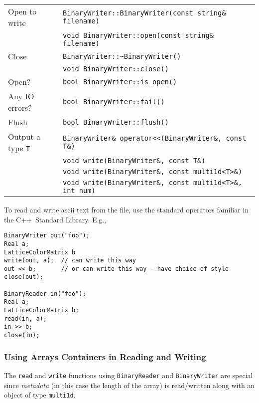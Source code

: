 \documentclass[12pt,letterpaper]{article}
\newcommand{\cpp}{C++}
\begin{document}
\begin{flushleft}
  \begin{tabular}{|l|l|}
  \hline
  Open to write  & \verb|BinaryWriter::BinaryWriter(const string& filename)|\\
                 & \verb|void BinaryWriter::open(const string& filename)|\\
  \hline
  Close          & \verb|BinaryWriter::~BinaryWriter()|\\
                 & \verb|void BinaryWriter::close()|\\
  \hline
  Open?          & \verb|bool BinaryWriter::is_open()| \\
  \hline
  Any IO errors? & \verb|bool BinaryWriter::fail()| \\
  \hline
  Flush          & \verb|bool BinaryWriter::flush()| \\
  \hline
  Output a type \verb|T| & \verb|BinaryWriter& operator<<(BinaryWriter&, const T&)| \\
                 & \verb|void write(BinaryWriter&, const T&)| \\
                 & \verb|void write(BinaryWriter&, const multi1d<T>&)| \\
                 & \verb|void write(BinaryWriter&, const multi1d<T>&, int num)| \\
  \hline
 \end{tabular}
\end{flushleft}
%
To read and write ascii text from the file, use the standard operators
familiar in the \cpp\ Standard Library. E.g.,
%
\begin{small}
\begin{verbatim}
BinaryWriter out("foo");
Real a;
LatticeColorMatrix b
write(out, a);  // can write this way
out << b;       // or can write this way - have choice of style
close(out);

BinaryReader in("foo");
Real a;
LatticeColorMatrix b;
read(in, a);
in >> b;
close(in);
\end{verbatim}
\end{small}

\subsubsection{Using Arrays Containers in Reading and Writing}

The \verb|read| and \verb|write| functions using \verb|BinaryReader|
and \verb|BinaryWriter| are special since {\em metadata} (in this case
the length of the array) is read/written along with an object of type
\verb|multi1d|. 
\end{document}
